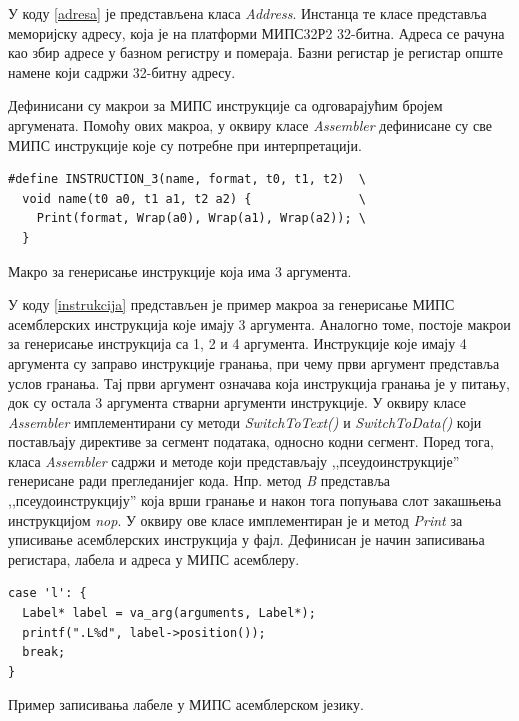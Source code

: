 \documentclass[12pt,oneside]{memoir}
\begin{document}
У коду \ref{adresa} је представљена класа \textit{Address}. Инстанца те класе представља меморијску адресу, која је на платформи МИПС32Р2 32-битна. Адреса се рачуна као збир адресе у базном регистру и помераја. Базни регистар је регистар опште намене који садржи 32-битну адресу. 

Дефинисани су макрои за МИПС инструкције са одговарајућим бројем аргумената. Помоћу ових макроа, у оквиру класе \textit{Assembler} дефинисане су све МИПС инструкције које су потребне при интерпретацији.\\

\begin{listing}
\begin{verbatim}
#define INSTRUCTION_3(name, format, t0, t1, t2)  \
  void name(t0 a0, t1 a1, t2 a2) {               \
    Print(format, Wrap(a0), Wrap(a1), Wrap(a2)); \
  }
\end{verbatim}
\caption{Макро за генерисање инструкције која има 3 аргумента.}
\label{instrukcija}
\end{listing}

У коду \ref{instrukcija} представљен је пример макроа за генерисање МИПС асемблерских инструкција које имају 3 аргумента. Аналогно томе, постоје макрои за генерисање инструкција са 1, 2 и 4 аргумента. Инструкције које имају 4 аргумента су заправо инструкције гранања, при чему први аргумент представља услов гранања. Тај први аргумент означава која инструкција гранања је у питању, док су остала 3 аргумента стварни аргументи инструкције.
У оквиру класе \textit{Assembler} имплементирани су методи \textit{SwitchToText()} и \textit{SwitchToData()} који постављају директиве за сегмент података, односно кодни сегмент. Поред тога, класа \textit{Assembler} садржи и методе који представљају ,,псеудоинструкције'' генерисане ради прегледанијег кода. Нпр. метод \textit{B} представља ,,псеудоинструкцију'' која врши гранање и након тога попуњава слот закашњења инструкцијом \textit{nop}. 
У оквиру ове класе имплементиран је и метод \textit{Print} за уписивање асемблерских инструкција у фајл. Дефинисан је начин записивања регистара, лабела и адреса у МИПС асемблеру.\\

\begin{listing}
\begin{verbatim}
case 'l': {
  Label* label = va_arg(arguments, Label*);
  printf(".L%d", label->position());
  break;
}
\end{verbatim}
\caption{Пример записивања лабеле у МИПС асемблерском језику.}
\label{print_labela}
\end{listing}
\end{document}
